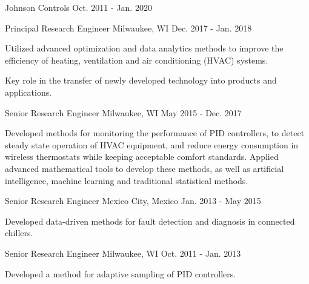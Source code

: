 

\begin{cventries}

\cvmultientry
{Johnson Controls} %
{}
{Oct. 2011 - Jan. 2020} %
{
\cvsubentry
{Principal Research Engineer} %
{Milwaukee, WI} %
{Dec. 2017 - Jan. 2018} %
{
\begin{cvitems} %
\item {Utilized advanced optimization and data analytics methods to improve the efficiency of heating, ventilation and air conditioning (HVAC) systems.}
\item {Key role in the transfer of newly developed technology into products and applications.}
\end{cvitems}
}
\cvsubentry
{Senior Research Engineer} %
{Milwaukee, WI} %
{May 2015 - Dec. 2017} %
{
\begin{cvitems} %
\item {Developed methods for monitoring the performance of PID controllers, to detect steady state operation of HVAC equipment, and reduce energy consumption in wireless thermostats while keeping acceptable comfort standards. Applied advanced mathematical tools to develop these methods, as well as artificial intelligence, machine learning and traditional statistical methods.}
\end{cvitems}
}
\cvsubentry
{Senior Research Engineer} %
{Mexico City, Mexico} %
{Jan. 2013 - May 2015} %
{
\begin{cvitems} %
\item {Developed data-driven methods for fault detection and diagnosis in connected chillers.}
\end{cvitems}
}
\cvsubentry
{Senior Research Engineer} %
{Milwaukee, WI} %
{Oct. 2011 - Jan. 2013} %
{
\begin{cvitems} %
\item {Developed a method for adaptive sampling of PID controllers.}
\end{cvitems}
}
}
\end{cventries}
